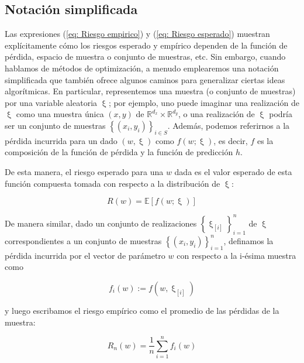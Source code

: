 \subsection{Notaci\'on simplificada}
Las expresiones (\ref{eq: Riesgo empirico}) y (\ref{eq: Riesgo esperado}) muestran expl\'icitamente c\'omo los riesgos esperado y emp\'irico dependen de la funci\'on de p\'erdida, espacio de muestra o conjunto de muestras, etc. Sin embargo, cuando hablamos de m\'etodos de optimizaci\'on, a menudo emplearemos una notaci\'on simplificada que tambi\'en ofrece algunos caminos para generalizar ciertas ideas algor\'itmicas. En particular, representemos una muestra (o conjunto de muestras) por una variable aleatoria $\upxi$; por ejemplo, uno puede imaginar una realizaci\'on de $\upxi$ como una muestra \'unica $(x, y)$ de $\mathbb{R}^{d_x} \times \mathbb{R}^{d_y}$, o una realizaci\'on de $\upxi$ podr\'ia ser un conjunto de muestras $\left\lbrace(x_i, y_i)\right\rbrace_{i \in S}$. Adem\'as, podemos referirnos a la p\'erdida incurrida para un dado $(w, \upxi)$ como $f (w; \upxi )$, es decir, $f$ es la composici\'on de la funci\'on de p\'erdida y la funci\'on de predicci\'on $h$.

De esta manera, el riesgo esperado para una $w$ dada es el valor esperado de esta funci\'on compuesta tomada con respecto a la distribuci\'on de $\upxi$:

\begin{equation}
\label{Riesgo esperado 3}
R(w) = \mathbb{E} \left [ f(w; \upxi) \right ]
\end{equation}

De manera similar, dado un conjunto de realizaciones $\left\lbrace \upxi_{\left [ i \right ]} \right\rbrace _{i=1}^{n}$ de $\upxi$ correspondientes a un conjunto de muestras $\left\lbrace (x_i, y_i) \right\rbrace_{i=1}^{n}$, definamos la p\'erdida incurrida por el vector de par\'ametro $w$ con respecto a la i-\'esima muestra como

\begin{equation}
\label{funci\'on p\'erdida de w}
f_i (w) := f(w, \upxi_{\left [ i \right ]})
\end{equation}

y luego escribamos el riesgo emp\'irico como el promedio de las p\'erdidas de la muestra:

\begin{equation}
\label{Riesgo empirico 3}
R_n(w) = \frac{1}{n}\sum\limits_{i=1}^{n} f_i (w)
\end{equation}

